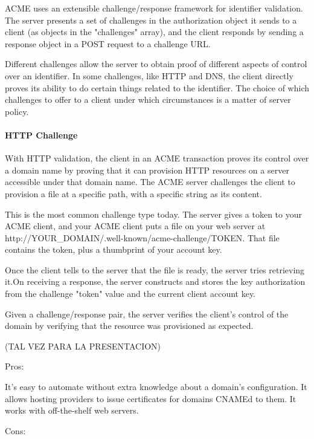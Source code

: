 ACME uses an extensible challenge/response framework for identifier
validation.  The server presents a set of challenges in the
authorization object it sends to a client (as objects in the
"challenges" array), and the client responds by sending a response
object in a POST request to a challenge URL.

   Different challenges allow the server to obtain proof of different
   aspects of control over an identifier.  In some challenges, like HTTP
   and DNS, the client directly proves its ability to do certain things
   related to the identifier.  The choice of which challenges to offer
   to a client under which circumstances is a matter of server policy.


   

\paragraph{HTTP Challenge}

   With HTTP validation, the client in an ACME transaction proves its
   control over a domain name by proving that it can provision HTTP
   resources on a server accessible under that domain name.  The ACME
   server challenges the client to provision a file at a specific path,
   with a specific string as its content.

   This is the most common challenge type today. The server gives a
   token to your ACME client, and your ACME client puts a file on your web 
   server at {http://\<YOUR\_DOMAIN\>/.well-known/acme-challenge/\<TOKEN\>}. That 
   file contains the token, plus a thumbprint of your account key. 

   Once the client tells to the server that the file is ready, the server 
   tries retrieving it.On receiving a response, the server constructs and stores the key
   authorization from the challenge "token" value and the current client
   account key.

   Given a challenge/response pair, the server verifies the client's
   control of the domain by verifying that the resource was provisioned
   as expected.

   (TAL VEZ PARA LA PRESENTACION)

   Pros:

    It’s easy to automate without extra knowledge about a domain’s configuration.
    It allows hosting providers to issue certificates for domains CNAMEd to them.
    It works with off-the-shelf web servers.

   Cons:

